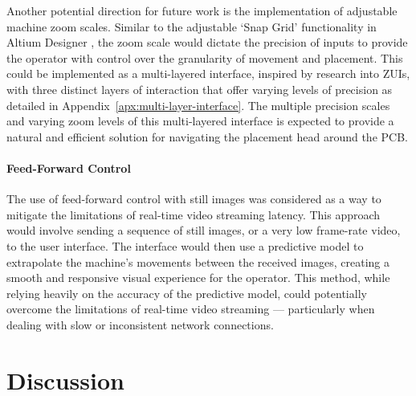 \documentclass[12pt,british,UKenglish]{article}
\begin{document}
Another potential direction for future work is the implementation of adjustable machine zoom scales.
Similar to the adjustable `Snap Grid' functionality in Altium Designer \cite{altiumChooseSnap}, the zoom scale would dictate the precision of inputs to provide the operator with control over the granularity of movement and placement.
This could be implemented as a multi-layered interface, inspired by research into \Acp{ZUI}, with three distinct layers of interaction that offer varying levels of precision as detailed in Appendix~\ref{apx:multi-layer-interface}.
The multiple precision scales and varying zoom levels of this multi-layered interface is expected to provide a natural and efficient solution for navigating the placement head around the \ac{PCB}.

\paragraph{Feed-Forward Control}

The use of feed-forward control with still images was considered as a way to mitigate the limitations of real-time video streaming latency.
This approach would involve sending a sequence of still images, or a very low frame-rate video, to the user interface.
The interface would then use a predictive model \cite{Dragan2013} to extrapolate the machine's movements between the received images, creating a smooth and responsive visual experience for the operator.
This method, while relying heavily on the accuracy of the predictive model, could potentially overcome the limitations of real-time video streaming --- particularly when dealing with slow or inconsistent network connections.


\section{Discussion}\label{sec:Discussion}

\end{document}
